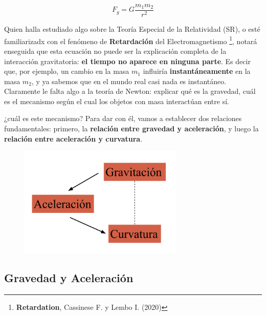 \begin{equation}
    F_{g}=G\frac{m_1 m_2}{r^2}
\end{equation}

Quien halla estudiado algo sobre la Teoría Especial de la Relatividad (SR), o esté familiarizadx con el fenómeno de \textbf{Retardación} del Electromagnetismo \footnote{\textbf{Retardation}, Cassinese F. y Lembo I. (2020)}, notará enseguida que esta ecuación no puede ser la explicación completa de la interacción gravitatoria: \textbf{el tiempo no aparece en ninguna parte}. Es decir que, por ejemplo, un cambio en la masa $m_1$ influiría \textbf{instantáneamente} en la masa $m_2$, y ya sabemos que en el mundo real casi nada es instantáneo. Claramente le falta algo a la teoría de Newton: explicar qué es la gravedad, cuál es el mecanismo según el cual los objetos con masa interactúan entre sí.

 ¿cuál es este mecanismo? Para dar con él, vamos a establecer dos relaciones fundamentales: primero, la \textbf{relación entre gravedad y aceleración}, y luego la \textbf{relación entre aceleración y curvatura}.


\begin{figure}[h!]
    \centering
    \includegraphics[width=0.7\textwidth]{Im/curvatura aceleracion.png}
    \label{fig:sen}
\end{figure}

\subsection*{\textbf{Gravedad y Aceleración}}

